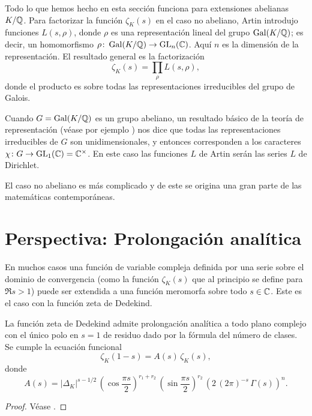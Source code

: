 \begin{comentario}
  Todo lo que hemos hecho en esta sección funciona para extensiones abelianas
  $K/\mathbb{Q}$. Para factorizar la función $\zeta_K (s)$ en el caso no abeliano,
  Artin introdujo funciones $L (s,\rho)$, donde $\rho$ es una representación
  lineal del grupo $\operatorname{Gal} (K/\mathbb{Q})$; es decir, un homomorfismo
  $\rho\colon \operatorname{Gal} (K/\mathbb{Q}) \to \operatorname{GL}_n (\mathbb{C})$. Aquí $n$ es la dimensión de
  la representación. El resultado general es la factorización
  $$\zeta_K (s) = \prod_\rho L (s,\rho),$$
  donde el producto es sobre todas las representaciones irreducibles del grupo
  de Galois.

  Cuando $G = \operatorname{Gal} (K/\mathbb{Q})$ es un grupo abeliano, un resultado básico de
  la teoría de representación (véase por ejemplo \cite{Serre-RLGF}) nos dice que
  todas las representaciones irreducibles de $G$ son unidimensionales, y
  entonces corresponden a los caracteres
  $\chi\colon G \to \operatorname{GL}_1 (\mathbb{C}) = \mathbb{C}^\times$. En este caso las funciones $L$
  de Artin serán las series $L$ de Dirichlet.

  El caso no abeliano es más complicado y de este se origina una gran parte de
  las matemáticas contemporáneas.
\end{comentario}


\section{Perspectiva: Prolongación analítica}

En muchos casos una función de variable compleja definida por una serie sobre
el dominio de convergencia (como la función $\zeta_K (s)$ que al principio se
define para $\Re s > 1$) puede ser extendida a una función meromorfa sobre todo
$s \in \mathbb{C}$. Este es el caso con la función zeta de Dedekind.

\begin{teorema}
  La función zeta de Dedekind admite prolongación analítica a todo plano
  complejo con el único polo en $s = 1$ de residuo dado por la fórmula del
  número de clases. Se cumple la ecuación funcional
  $$\zeta_K (1-s) = A(s)\,\zeta_K (s),$$
  donde
  $$A (s) = |\Delta_K|^{s - 1/2}\,\left(\cos\frac{\pi s}{2}\right)^{r_1+r_2}\,\left(\sin\frac{\pi s}{2}\right)^{r_2}\,\left(2\,(2\pi)^{-s}\,\Gamma (s)\right)^n.$$

  \begin{proof}
    Véase \cite[\S VII.5]{Neukirch-ANT}.
  \end{proof}
\end{teorema}

